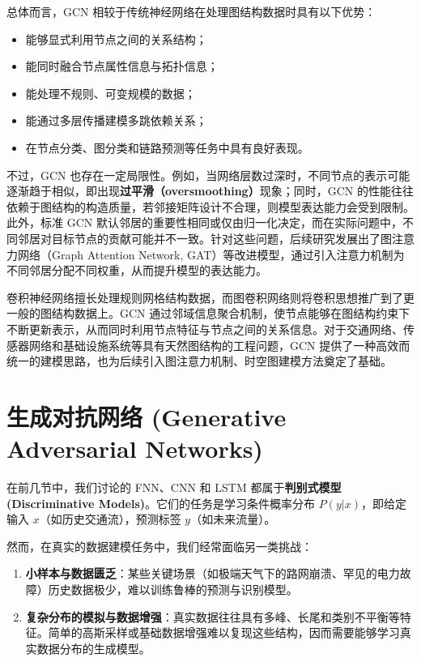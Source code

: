 总体而言，GCN 相较于传统神经网络在处理图结构数据时具有以下优势：
\begin{itemize}
    \item 能够显式利用节点之间的关系结构；
    \item 能同时融合节点属性信息与拓扑信息；
    \item 能处理不规则、可变规模的数据；
    \item 能通过多层传播建模多跳依赖关系；
    \item 在节点分类、图分类和链路预测等任务中具有良好表现。
\end{itemize}

不过，GCN 也存在一定局限性。例如，当网络层数过深时，不同节点的表示可能逐渐趋于相似，即出现\textbf{过平滑（oversmoothing）}现象；同时，GCN 的性能往往依赖于图结构的构造质量，若邻接矩阵设计不合理，则模型表达能力会受到限制。此外，标准 GCN 默认邻居的重要性相同或仅由归一化决定，而在实际问题中，不同邻居对目标节点的贡献可能并不一致。针对这些问题，后续研究发展出了图注意力网络（Graph Attention Network, GAT）等改进模型，通过引入注意力机制为不同邻居分配不同权重，从而提升模型的表达能力。


卷积神经网络擅长处理规则网格结构数据，而图卷积网络则将卷积思想推广到了更一般的图结构数据上。GCN 通过邻域信息聚合机制，使节点能够在图结构约束下不断更新表示，从而同时利用节点特征与节点之间的关系信息。对于交通网络、传感器网络和基础设施系统等具有天然图结构的工程问题，GCN 提供了一种高效而统一的建模思路，也为后续引入图注意力机制、时空图建模方法奠定了基础。

\section{生成对抗网络 (Generative Adversarial Networks)}
\label{sec:gan}

在前几节中，我们讨论的 FNN、CNN 和 LSTM 都属于\textbf{判别式模型 (Discriminative Models)}。它们的任务是学习条件概率分布 $P(y|x)$，即给定输入 $x$（如历史交通流），预测标签 $y$（如未来流量）。

然而，在真实的数据建模任务中，我们经常面临另一类挑战：
\begin{enumerate}
    \item \textbf{小样本与数据匮乏}：某些关键场景（如极端天气下的路网崩溃、罕见的电力故障）历史数据极少，难以训练鲁棒的预测与识别模型。
    \item \textbf{复杂分布的模拟与数据增强}：真实数据往往具有多峰、长尾和类别不平衡等特征。简单的高斯采样或基础数据增强难以复现这些结构，因而需要能够学习真实数据分布的生成模型。
\end{enumerate}

